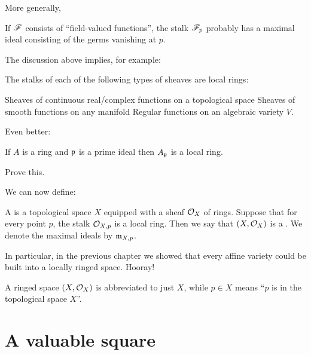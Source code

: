More generally,
\begin{moral}
	If $\mathscr F$ consists of ``field-valued functions'',
	the stalk $\mathscr F_p$ probably has a maximal ideal
	consisting of the germs vanishing at $p$.
\end{moral}
The discussion above implies, for example:
\begin{proposition}
	The stalks of each of the following types of sheaves are local rings:
	\begin{enumerate}[(a)]
		\ii Sheaves of continuous real/complex functions on a topological space
		\ii Sheaves of smooth functions on any manifold
		\ii Regular functions on an algebraic variety $V$.
	\end{enumerate}
\end{proposition}
Even better:
\begin{theorem}
	If $A$ is a ring and $\mathfrak p$ is a prime ideal
	then $A_\mathfrak p$ is a local ring.
\end{theorem}
\begin{exercise}
	Prove this.
\end{exercise}

We can now define:
\begin{definition}
	A  is a topological space $X$ equipped
	with a sheaf $\mathcal O_X$ of rings.
	Suppose that for every point $p$, the stalk $\mathcal O_{X,p}$
	is a local ring.
	Then we say that $(X, \mathcal O_X)$ is a .
	We denote the maximal ideals by $\mathfrak m_{X,p}$.
\end{definition}

In particular, in the previous chapter we showed that every
affine variety could be built into a locally ringed space. Hooray!
\begin{abuse}
	A ringed space $(X, \mathcal O_X)$ is abbreviated to just $X$,
	while $p \in X$ means ``$p$ is in the topological space $X$''.
\end{abuse}


\section{A valuable square}


